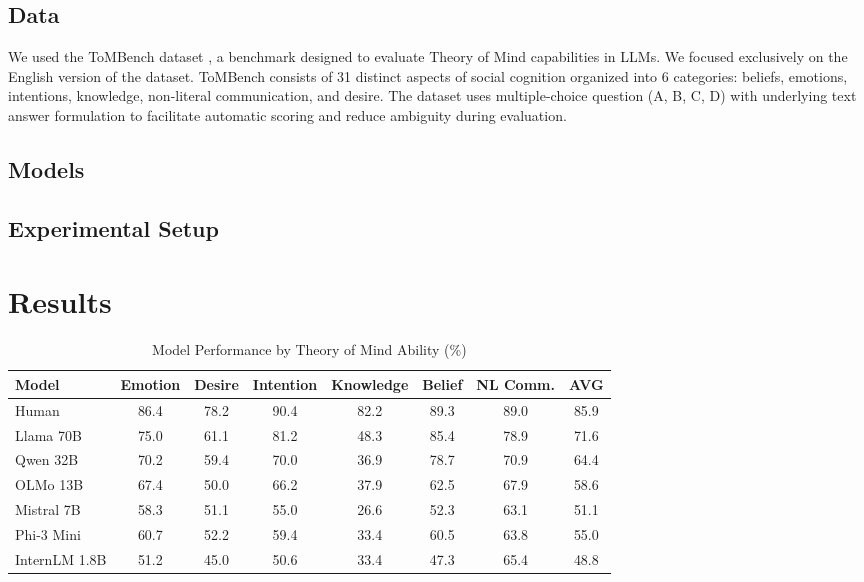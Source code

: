 \documentclass[11pt,a4paper]{article}
\begin{document}
\subsection{Data}
We used the ToMBench dataset \cite{chen-etal-2024-tombench}, a benchmark designed to evaluate Theory of Mind capabilities in LLMs. We focused exclusively on the English version of the dataset. ToMBench consists of 31 distinct aspects of social cognition organized into 6 categories: beliefs, emotions, intentions, knowledge, non-literal communication, and desire. The dataset uses multiple-choice question (A, B, C, D) with underlying text answer formulation to facilitate automatic scoring and reduce ambiguity during evaluation. 
\subsection{Models}

\subsection{Experimental Setup}


\section{Results}

\begin{table*}[!htbp]
\centering
\caption{Model Performance by Theory of Mind Ability (\%)}
\label{tab:model_performance}
\begin{tabular}{l|cccccc|c}
\toprule
\textbf{Model} & \textbf{Emotion} & \textbf{Desire} & \textbf{Intention} & \textbf{Knowledge} & \textbf{Belief} & \textbf{NL Comm.} & \textbf{AVG} \\
\midrule
Human & 86.4 & 78.2 & 90.4 & 82.2 & 89.3 & 89.0 & 85.9 \\
\midrule
Llama 70B & 75.0 & 61.1 & 81.2 & 48.3 & 85.4 & 78.9 & 71.6 \\
Qwen 32B & 70.2 & 59.4 & 70.0 & 36.9 & 78.7 & 70.9 & 64.4 \\
OLMo 13B & 67.4 & 50.0 & 66.2 & 37.9 & 62.5 & 67.9 & 58.6 \\
Mistral 7B & 58.3 & 51.1 & 55.0 & 26.6 & 52.3 & 63.1 & 51.1 \\
Phi-3 Mini & 60.7 & 52.2 & 59.4 & 33.4 & 60.5 & 63.8 & 55.0 \\
InternLM 1.8B & 51.2 & 45.0 & 50.6 & 33.4 & 47.3 & 65.4 & 48.8 \\
\bottomrule
\end{tabular}
\end{table*}
\end{document}

